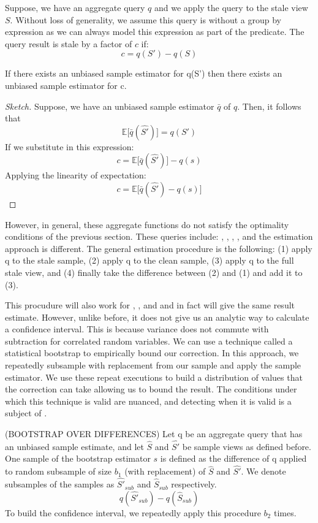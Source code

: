 Suppose, we have an aggregate query $q$ and we apply the query to the stale view $S$.
Without loss of generality, we assume this query is without a group by expression as we can always model this expression as part of the predicate.
The query result is stale by a factor of $c$ if:
\[ c = q(S') - q(S)\] 

\begin{lemma}\label{lemma:unbiased}
If there exists an unbiased sample estimator for q(S') then there exists an unbiased sample estimator for c.
\end{lemma}

\begin{proof}[Sketch] Suppose, we have an unbiased sample estimator $\bar{q}$ of $q$. 
Then, it follows that \[\mathbb{E}\big[\bar{q}(\hat{S'})\big] = q(S')\]
If we substitute in this expression:
\[ c = \mathbb{E}\big[\bar{q}(\hat{S'})\big] -q(s) \] 
Applying the linearity of expectation:
\[ c = \mathbb{E}\big[\bar{q}(\hat{S'}) - q(s)\big] \]
\end{proof}

However, in general, these aggregate functions do not satisfy the optimality conditions of the previous section.
These queries include: \histfunc, \corrfunc, \varfunc, \covfunc, and the estimation approach is different.
The general estimation procedure is the following: (1) apply q to the stale sample, (2) apply q to the clean sample, (3) apply q to the full stale view, and (4) finally take the difference between (2) and (1) and add it to (3). 

This procudure will also work for \sumfunc, \countfunc, and \avgfunc and in fact will give the same result estimate.
However, unlike before, it does not give us an analytic way to calculate a confidence interval.
This is because variance does not commute with subtraction for correlated random variables.
We can use a technique called a statistical bootstrap \cite{AgarwalMPMMS13} to empirically bound our correction.
In this approach, we repeatedly subsample with replacement from our sample and apply the sample estimator.
We use these repeat executions to build a distribution of values that the correction can take allowing us to bound the result.
The conditions under which this technique is valid are nuanced, and detecting when it is valid is a subject of \cite{agarwalknowing}.

\begin{proposition} (BOOTSTRAP OVER DIFFERENCES) Let q be an aggregate query that has an unbiased sample estimate, and let $\hat{S}$ and $\hat{S'}$ be sample views as defined before. 
One sample of the bootstrap estimator $s$ is defined as the difference of q applied to random subsample of size $b_1$ (with replacement) of $\hat{S}$ and $\hat{S'}$.
We denote subsamples of the samples as $\hat{S'}_{sub}$ and $\hat{S}_{sub}$ respectively.
\[q(\hat{S'}_{sub}) - q(\hat{S}_{sub})\]
To build the confidence interval, we repeatedly apply this procedure $b_2$ times.
\end{proposition}

